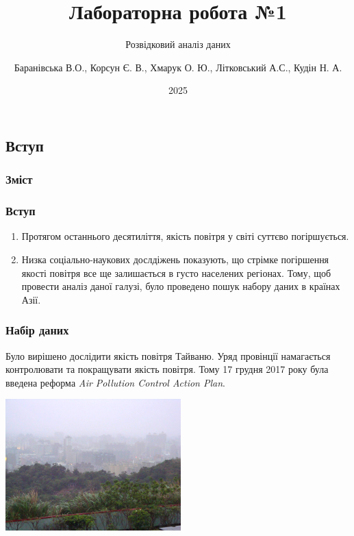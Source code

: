 \documentclass{beamer}
\title{Лабораторна робота №1}
\subtitle{Розвідковий аналіз даних}
\author[]{
  Баранівська В.О.,
  Корсун Є. В.,
  Хмарук О. Ю.,
  Літковський А.С.,
  Кудін Н. А.
}
\date{2025}
\begin{document}
\frame{\titlepage}

\graphicspath{{../../../}}

\begin{frame}
  \section{Вступ}

  \frametitle{Зміст}
  \tableofcontents[currentsection]
\end{frame}

\begin{frame}
  \frametitle{Вступ}

  \begin{enumerate}
    \item Протягом останнього десятиліття, якість повітря у світі суттєво погіршується.

    \item Низка соціально-наукових дослдіжень показують, що стрімке погіршення якості повітря
    все ще залишається в густо населених регіонах. Тому, щоб провести аналіз даної галузі,
    було проведено пошук набору даних в країнах Азії.

  \end{enumerate}
\end{frame}

\begin{frame}
  \frametitle{Набір даних}

  Було вирішено дослідити якість повітря Тайваню. Уряд провінції намагається
  контролювати та покращувати якість повітря. Тому 17 грудня 2017 року була введена
  реформа \textit{Air Pollution Control Action Plan}.

  \begin{center}
    \includegraphics[height=2in]{notes/media/air_pollution.jpg}
  \end{center}
\end{frame}
\end{document}
